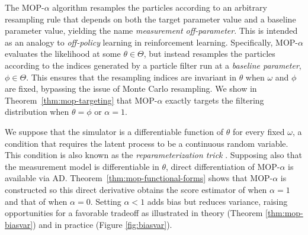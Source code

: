 \documentclass[9pt,twocolumn,pnasresearcharticle]{pnas-new}
\begin{document}
The MOP-$\alpha$ algorithm resamples the particles according to an arbitrary resampling rule that depends on both the target parameter value and a baseline parameter value, yielding the name {\it measurement off-parameter}.
This is intended as an analogy to {\it off-policy} learning in reinforcement learning.
Specifically, MOP-$\alpha$ evaluates the likelihood at some $\theta \in \Theta$, but instead resamples the particles according to the indices generated by a particle filter run at a {\it baseline parameter}, $\phi \in \Theta$.
This ensures that the resampling indices are invariant in $\theta$ when $\omega$ and $\phi$ are fixed, bypassing the issue of Monte Carlo resampling.
We show in Theorem~\ref{thm:mop-targeting} that MOP-$\alpha$ exactly targets the filtering distribution when $\theta=\phi$ or $\alpha=1$.

We suppose that the simulator is a differentiable function of $\theta$ for every fixed $\omega$, a condition that requires the latent process to be a continuous random variable. 
This condition is also known as the {\it reparameterization trick} \cite{corenflos21}.
Supposing also that the measurement model is differentiable in $\theta$, direct differentiation of MOP-$\alpha$ is available via AD.
Theorem~\ref{thm:mop-functional-forms} shows that MOP-$\alpha$ is constructed so this direct derivative obtains the score estimator of  \cite{poyiadjis11, scibior21} when $\alpha=1$ and that of \cite{naesseth18} when $\alpha=0$.
Setting $\alpha<1$ adds bias but reduces variance, raising opportunities for a favorable tradeoff as illustrated in theory (Theorem \ref{thm:mop-biasvar}) and in practice (Figure \ref{fig:biasvar}).
\end{document}
